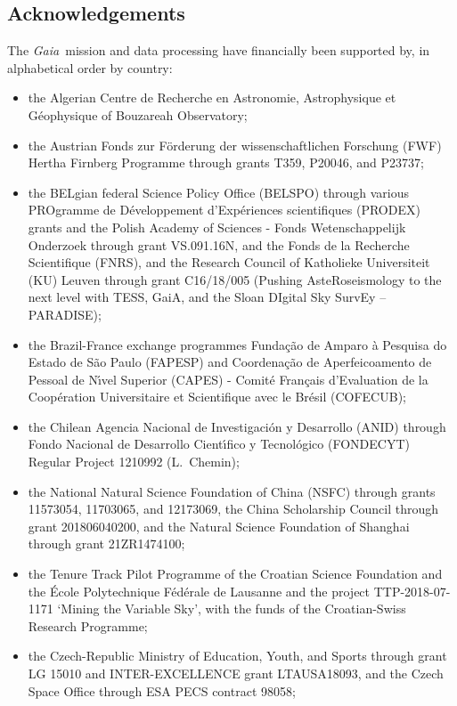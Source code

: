 \documentclass{aa}
\newcommand{\gaia}{\textit{Gaia}\xspace}
\begin{document}
\begin{appendix} 

\section{Acknowledgements}
\label{sec:app_ack}
%
The \gaia\ mission and data processing have financially been supported by, in alphabetical order by country:

\begin{itemize}
\item the Algerian Centre de Recherche en Astronomie, Astrophysique et G\'{e}ophysique of Bouzareah Observatory;
\item the Austrian Fonds zur F\"{o}rderung der wissenschaftlichen Forschung (FWF) Hertha Firnberg Programme through grants T359, P20046, and P23737;
\item the BELgian federal Science Policy Office (BELSPO) through various PROgramme de D\'{e}veloppement d'Exp\'{e}riences scientifiques (PRODEX) grants and the Polish Academy of Sciences - Fonds Wetenschappelijk Onderzoek through grant VS.091.16N, and the Fonds de la Recherche Scientifique (FNRS), and the Research Council of Katholieke Universiteit (KU) Leuven through grant C16/18/005 (Pushing AsteRoseismology to the next level with TESS, GaiA, and the Sloan DIgital Sky SurvEy -- PARADISE);  
\item the Brazil-France exchange programmes Funda\c{c}\~{a}o de Amparo \`{a} Pesquisa do Estado de S\~{a}o Paulo (FAPESP) and Coordena\c{c}\~{a}o de Aperfeicoamento de Pessoal de N\'{\i}vel Superior (CAPES) - Comit\'{e} Fran\c{c}ais d'Evaluation de la Coop\'{e}ration Universitaire et Scientifique avec le Br\'{e}sil (COFECUB);
\item the Chilean Agencia Nacional de Investigaci\'{o}n y Desarrollo (ANID) through Fondo Nacional de Desarrollo Cient\'{\i}fico y Tecnol\'{o}gico (FONDECYT) Regular Project 1210992 (L.~Chemin);
\item the National Natural Science Foundation of China (NSFC) through grants 11573054, 11703065, and 12173069, the China Scholarship Council through grant 201806040200, and the Natural Science Foundation of Shanghai through grant 21ZR1474100;  
\item the Tenure Track Pilot Programme of the Croatian Science Foundation and the \'{E}cole Polytechnique F\'{e}d\'{e}rale de Lausanne and the project TTP-2018-07-1171 `Mining the Variable Sky', with the funds of the Croatian-Swiss Research Programme;
\item the Czech-Republic Ministry of Education, Youth, and Sports through grant LG 15010 and INTER-EXCELLENCE grant LTAUSA18093, and the Czech Space Office through ESA PECS contract 98058;

\end{itemize}
\end{appendix}
\end{document}
